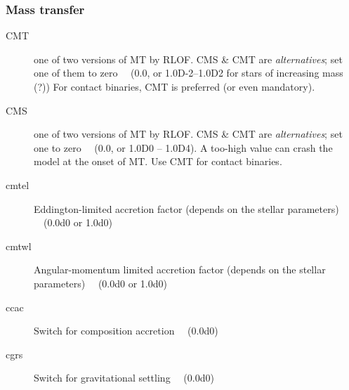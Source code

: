 \subsubsection{Mass transfer}
\label{sec:masstransfer}
\begin{description}
\item[CMT]\hypertarget{cmt}{} one of two versions of MT by RLOF. CMS \& CMT are \emph{alternatives}; set one of them to zero \ \ 
(0.0, or 1.0D-2--1.0D2 for stars of increasing mass (?))  For contact binaries, CMT is preferred (or even mandatory).
\item[CMS]\hypertarget{cms}{} one of two versions of MT by RLOF. CMS \& CMT are \emph{alternatives}; set one to zero \ \ (0.0, or 1.0D0 -- 1.0D4).
A too-high value can crash the model at the onset of MT.  Use CMT for contact binaries.

\item[cmtel]\hypertarget{cmtel}{} Eddington-limited accretion factor (depends on the stellar parameters) \ \  (0.0d0 or 1.0d0)
\item[cmtwl]\hypertarget{cmtwl}{} Angular-momentum limited accretion factor (depends on the stellar parameters) \ \ (0.0d0 or 1.0d0)
\item[ccac]\hypertarget{ccac}{} Switch for composition accretion \ \  (0.0d0)
\item[cgrs]\hypertarget{cgrs}{} Switch for gravitational settling  \ \ (0.0d0)
\end{description}




